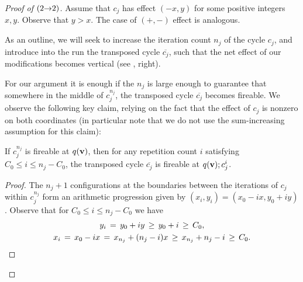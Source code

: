 \begin{proof}[Proof of  $({2}{\rightarrow}{2})$]
Assume that $c_j$ has effect $(-x,y)$ for some positive integers $x,y$.
Observe that $y > x$.
The case of $(+,-)$ effect is analogous.

As an outline, we will seek to increase the iteration count $n_j$ of
the cycle $c_j$, and introduce into the run the transposed cycle
$\overline{c_j}$, such that the net effect of our modifications
becomes vertical (see , right).

% 
For our argument it is enough if the $n_j$ is large enough to guarantee that 
somewhere in the middle of $c_j^{n_j}$, the 
transposed cycle $\overline{c_j}$ becomes fireable.
We observe the following key claim, relying on the fact that  
the effect of $c_j$ is nonzero on both coordinates
(in particular note that we do not use the sum-increasing
assumption for this claim):
%
\begin{claim}  \label{claim:fireable}
    If $c_j^{n_j}$ is fireable at $q(\mathbf{v})$, then for any
    repetition count $i$ satisfying
    $C_0 \leq i \leq n_j - C_0$,
    the transposed cycle $\overline{c_j}$ is fireable at $q(\mathbf{v}); c_j^i$.
\end{claim}
%
\begin{proof}
The $n_j+1$ configurations at the boundaries between
the iterations of $c_j$ within $c_j^{n_j}$
form an arithmetic progression given by
$(x_i, y_i) = (x_0 - i x, y_0 + i y)$.
Observe that for $C_0 \leq i \leq n_j - C_0$
we have
\begin{gather*}
    y_i \,=\, y_0 + iy \,\geq\, y_0 + i \,\geq\, C_0, \\
    x_i \,=\, x_0 - ix \,=\, x_{n_j} + (n_j - i) x
    \,\geq\, x_{n_j} + n_j - i \,\geq\, C_0.
    \qedhere
\end{gather*}
%
\end{proof}


\end{proof}
